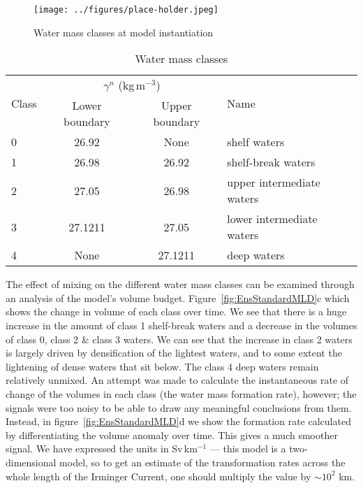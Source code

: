 \begin{figure} 
    \centering
    \texttt{[image: ../figures/place-holder.jpeg]}
    \caption{Water mass classes at model instantiation}
    \label{fig:WaterClass}
\end{figure}

\begin{table}[]
    \caption{Water mass classes}
    \label{tab:Class}
    \begin{tabular}{lccl}
        \hline
    \multirow{2}{*}{Class} & \multicolumn{2}{c}{$\gamma^n$ (kg\,m$^{-3}$)}  & \multirow{2}{*}{Name}     \\
                           & Lower boundary & Upper boundary &                           \\ \hline \hline
    0                      & 26.92          & None           & shelf waters              \\
    1                      & 26.98          & 26.92          & shelf-break waters        \\
    2                      & 27.05          & 26.98          & upper intermediate waters \\
    3                      & 27.1211        & 27.05          & lower intermediate waters \\
    4                      & None           & 27.1211        & deep waters               \\ \hline
    \end{tabular}
    \end{table}

The effect of mixing on the different water mass classes can be examined through an analysis of the model's volume budget. Figure~\ref{fig:EnsStandardMLD}c which shows the change in volume of each class over time. We see that there is a huge increase in the amount of class 1 shelf-break waters and a decrease in the volumes of class 0, class 2 \& class 3 waters. We can see that the increase in class 2 waters is largely driven by densification of the lightest waters, and to some extent the lightening of dense waters that sit below. The class 4 deep waters remain relatively unmixed. An attempt was made to calculate the instantaneous rate of change of the volumes in each class (the water mass formation rate), however; the signals were too noisy to be able to draw any meaningful conclusions from them\footnotemark. Instead, in figure~\ref{fig:EnsStandardMLD}d we show the formation rate calculated by differentiating the volume anomaly over time. This gives a much smoother signal. We have expressed the units in Sv\,km$^{-1}$ --- this model is a two-dimensional model, so to get an estimate of the transformation rates across the whole length of the Irminger Current, one should multiply the value by $\sim 10^2$ km.

